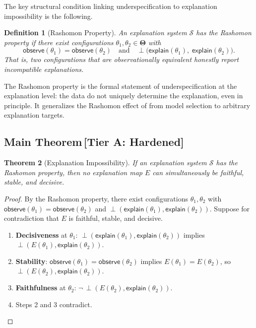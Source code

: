 \documentclass[11pt,a4paper]{article}
\newtheorem{theorem}{Theorem}[section]
\newtheorem{definition}[theorem]{Definition}
\newcommand{\Params}{\mathbf{\Theta}}
\newcommand{\incomp}{\perp}
\begin{document}
The key structural condition linking underspecification to explanation
impossibility is the following.

\begin{definition}[Rashomon Property]
\label{def:rashomon}
An explanation system $\mathcal{S}$ has the \emph{Rashomon property} if there
exist configurations $\theta_1, \theta_2 \in \Params$ with
\[
  \mathsf{observe}(\theta_1) = \mathsf{observe}(\theta_2)
  \quad\text{and}\quad
  \incomp\bigl(\mathsf{explain}(\theta_1),\;\mathsf{explain}(\theta_2)\bigr).
\]
That is, two configurations that are observationally equivalent honestly report
incompatible explanations.
\end{definition}

The Rashomon property is the formal statement of underspecification at the
explanation level: the data do not uniquely determine the explanation, even in
principle.  It generalizes the Rashomon effect of
\citet{rudin2024amazing,fisher2019models} from model selection to arbitrary
explanation targets.

\subsection{Main Theorem\,\textnormal{\normalsize[Tier A: Hardened]}}

\begin{theorem}[Explanation Impossibility]
\label{thm:universal}
If an explanation system $\mathcal{S}$ has the Rashomon property, then no
explanation map $E$ can simultaneously be faithful, stable, and decisive.
\end{theorem}

\begin{proof}
By the Rashomon property, there exist configurations $\theta_1, \theta_2$ with
$\mathsf{observe}(\theta_1) = \mathsf{observe}(\theta_2)$ and
$\incomp(\mathsf{explain}(\theta_1), \mathsf{explain}(\theta_2))$.
Suppose for contradiction that $E$ is faithful, stable, and decisive.
\begin{enumerate}
  \item \textbf{Decisiveness} at $\theta_1$:
    $\incomp(\mathsf{explain}(\theta_1), \mathsf{explain}(\theta_2))$
    implies
    $\incomp(E(\theta_1), \mathsf{explain}(\theta_2))$.
  \item \textbf{Stability}:
    $\mathsf{observe}(\theta_1) = \mathsf{observe}(\theta_2)$
    implies $E(\theta_1) = E(\theta_2)$, so
    $\incomp(E(\theta_2), \mathsf{explain}(\theta_2))$.
  \item \textbf{Faithfulness} at $\theta_2$:
    $\neg\,\incomp(E(\theta_2), \mathsf{explain}(\theta_2))$.
  \item Steps 2 and 3 contradict.  \qedhere
\end{enumerate}
\end{proof}
\end{document}
